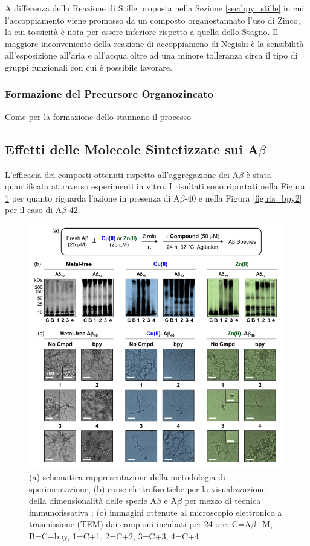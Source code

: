 \documentclass[a4paper, 12pt]{article}
\begin{document}
A differenza della Reazione di Stille proposta nella Sezione \ref{sec:bpy_stille} in cui l'accoppiamento viene promosso da un composto organostannato l'uso di Zinco, la cui tossicità è nota per essere inferiore rispetto a quella dello Stagno. Il maggiore inconveniente della reazione di accoppiameno di Negishi è la sensibilità all'esposizione all'aria e all'acqua oltre ad una minore tolleranza circa il tipo di gruppi funzionali con cui è possibile lavorare.\cite{nicolaou_palladium-catalyzed_2005}

\subsubsection{Formazione del Precursore Organozincato}
Come per la formazione dello stannano il processo


\subsection{Effetti delle Molecole Sintetizzate sui A$\beta$}
L'efficacia dei composti ottenuti rispetto all'aggregazione dei A$\beta$ è stata quantificata attraverso esperimenti in vitro. I risultati sono riportati nella Figura \ref{fig:ris_bpy} per quanto riguarda l'azione in presenza di A$\beta$-40 e nella Figura \ref{fig:ris_bpy2} per il caso di A$\beta$-42.

\begin{figure}[H]
	\centering
	\includegraphics[width=\linewidth]{immagini/ris_bpy.png}
	\caption{(a) schematica rappresentazione della metodologia di sperimentazione; (b) corse elettroforetiche per la visualizzazione della dimensionalità delle specie A$\beta$ e A$\beta$ per mezzo di tecnica immunofissativa \cite{kurien_western_2006}; (c) immagini ottenute al microscopio elettronico a trasmissione (TEM) dai campioni incubati per 24 ore. C=A$\beta$+M, B=C+bpy, 1=C+1, 2=C+2, 3=C+3, 4=C+4 }
	\label{fig:ris_bpy}
\end{figure}
\end{document}
